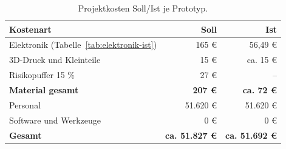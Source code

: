 \begin{table}[H]
\centering
\footnotesize
\caption{Projektkosten Soll/Ist je Prototyp.}
\label{tab:kosten-sollist}
\begin{tabular}{@{}lrr@{}}
\toprule
\textbf{Kostenart} & \textbf{Soll} & \textbf{Ist}\\
\midrule
Elektronik (Tabelle~\ref{tab:elektronik-ist}) & 165 \euro & 56,49 \euro\\
3D-Druck und Kleinteile & 15 \euro & ca. 15 \euro\\
Risikopuffer 15 \% & 27 \euro & -- \\
\textbf{Material gesamt} & \textbf{207 \euro} & \textbf{ca. 72 \euro}\\
\midrule
Personal & 51.620 \euro & 51.620 \euro \\
Software und Werkzeuge & 0 \euro & 0 \euro\\
\midrule
\textbf{Gesamt} & \textbf{ca. 51.827 \euro} & \textbf{ca. 51.692 \euro} \\
\bottomrule
\end{tabular}
\end{table}







